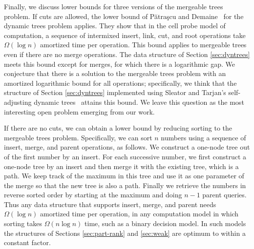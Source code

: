 \documentclass[twoside,leqno,twocolumn]{article}
\begin{document}
Finally, we discuss lower bounds for three versions of the mergeable trees problem.  If cuts are allowed, the lower bound of P\u{a}tra\c{s}cu and Demaine~\cite{loglb:pd06} for the dynamic trees problem applies.  They show that in the cell probe model of computation, a sequence of intermixed insert, link, cut, and root operations take $\Omega(\log n)$ amortized time per operation.  This bound applies to mergeable trees even if there are no merge operations.  The data structure of Section \ref{sec:dyntrees} meets this bound except for merges, for which there is a logarithmic gap.  We conjecture that there is a solution to the mergeable trees problem with an amortized logarithmic bound for all operations; specifically, we think that the structure of Section \ref{sec:dyntrees} implemented using Sleator and Tarjan's self-adjusting dynamic trees~\cite{ST85} attains this bound.  We leave this question as the most interesting open problem emerging from our work.

If there are no cuts, we can obtain a lower bound by reducing sorting to the mergeable trees problem.  Specifically, we can sort $n$ numbers using a sequence of insert, merge, and parent operations, as follows.  We construct a one-node tree out of the first number by an insert.  For each successive number, we first construct a one-node tree by an insert and then merge it with the existing tree, which is a path.  We keep track of the maximum in this tree and use it as one parameter of the merge so that the new tree is also a path.  Finally we retrieve the numbers in reverse sorted order by starting at the maximum and doing $n-1$ parent queries.  Thus any data structure that supports insert, merge, and parent needs $\Omega(\log n)$ amortized time per operation, in any computation model in which sorting takes $\Omega(n \log n)$ time, such as a binary decision model.  In such models the structures of Sections \ref{sec:part-rank} and \ref{sec:weak} are optimum to within a constant factor.
\end{document}

